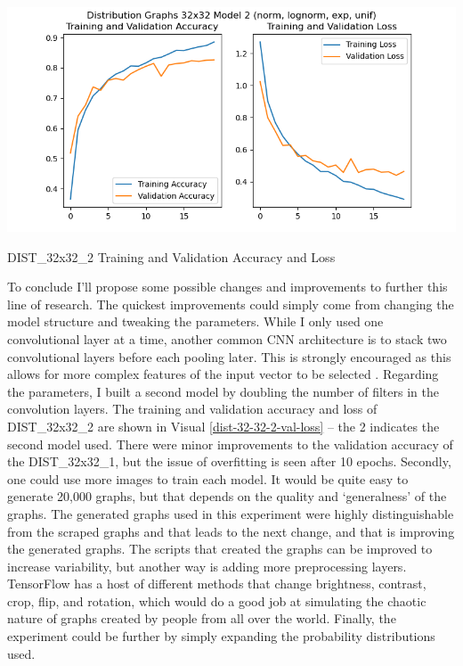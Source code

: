 \documentclass[12pt]{article}
\begin{document}
            \begin{table}[h]

                \begin{center}

                    \includegraphics[scale=0.6]{DIST_32x32_2_HIST_RESULTS.png}
                    \caption{DIST\_32x32\_2 Training and Validation Accuracy and Loss}
                    \label{dist-32-32-2-val-loss}
        
                \end{center}
            
            \end{table}

            To conclude I’ll propose some possible changes and improvements to further this line of research. 
            The quickest improvements could simply come from changing the model structure and tweaking the parameters. 
            While I only used one convolutional layer at a time, 
            another common CNN architecture is to stack two convolutional layers before each pooling later. 
            This is strongly encouraged as this allows for more complex features of the input vector to be selected \cite{oshea2015}. 
            Regarding the parameters, I built a second model by doubling the number of filters in the convolution layers. 
            The training and validation accuracy and loss of DIST\_32x32\_2
            are shown in Visual \ref{dist-32-32-2-val-loss} --
            the 2 indicates the second model used.
            There were minor improvements to the validation accuracy of the DIST\_32x32\_1, 
            but the issue of overfitting is seen after 10 epochs. Secondly, one could use more images to train each model. 
            It would be quite easy to generate 20,000 graphs, but that depends on the quality and ‘generalness’ of the graphs. 
            The generated graphs used in this experiment were highly distinguishable from the scraped graphs 
            and that leads to the next change, and that is improving the generated graphs. 
            The scripts that created the graphs can be improved to increase variability, 
            but another way is adding more preprocessing layers. TensorFlow has a host of different methods 
            that change brightness, contrast, crop, flip, and rotation, 
            which would do a good job at simulating the chaotic nature of graphs created by people from all over the world. 
            Finally, the experiment could be further by simply expanding the probability distributions used.
            
\end{document}
